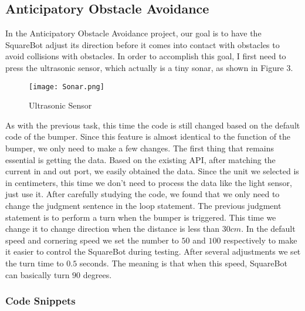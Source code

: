 \documentclass[12pt]{report}
\begin{document}
\subsection{Anticipatory Obstacle Avoidance}
In the Anticipatory Obstacle Avoidance project, our goal is to have the SquareBot adjust its direction before it comes into contact with obstacles to avoid collisions with obstacles. In order to accomplish this goal, I first need to press the ultrasonic sensor, which actually is a tiny sonar, as shown in Figure 3.
\begin{figure}[htbp]
	\centering
	\texttt{[image: Sonar.png]}
	\caption{Ultrasonic Sensor }
\end{figure}
As with the previous task, this time the code is still changed based on the default code of the bumper. Since this feature is almost identical to the function of the bumper, we only need to make a few changes. The first thing that remains essential is getting the data. Based on the existing API, after matching the current in and out port, we easily obtained the data. Since the unit we selected is in centimeters, this time we don't need to process the data like the light sensor, just use it. After carefully studying the code, we found that we only need to change the judgment sentence in the loop statement. The previous judgment statement is to perform a turn when the bumper is triggered. This time we change it to change direction when the distance is less than $30cm$. In the default speed and cornering speed we set the number to $50$ and $100$ respectively to make it easier to control the SquareBot during testing. After several adjustments we set the turn time to $0.5$ seconds. The meaning is that when this speed, SquareBot can basically turn $90$ degrees.

\subsubsection{Code Snippets}
\end{document}
